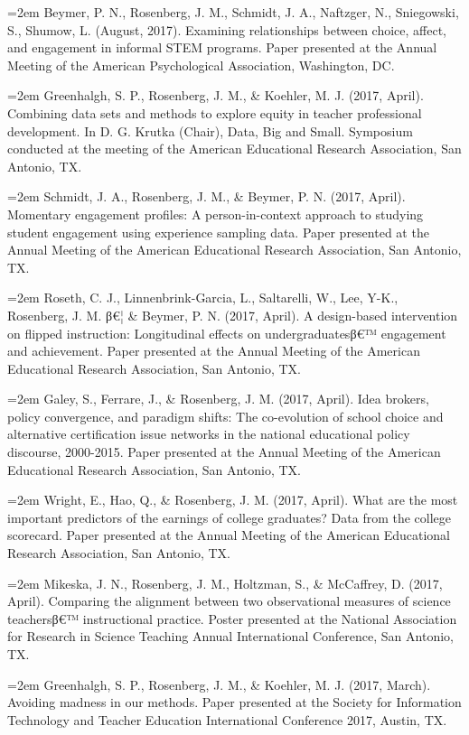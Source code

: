 \documentclass[]{article}
\newcommand{\euro}{€}
\begin{document}
\hangindent=2em Beymer, P. N., Rosenberg, J. M., Schmidt, J. A.,
Naftzger, N., Sniegowski, S., Shumow, L. (August, 2017). Examining
relationships between choice, affect, and engagement in informal STEM
programs. Paper presented at the Annual Meeting of the American
Psychological Association, Washington, DC.

\hangindent=2em Greenhalgh, S. P., Rosenberg, J. M., \& Koehler, M. J.
(2017, April). Combining data sets and methods to explore equity in
teacher professional development. In D. G. Krutka (Chair), Data, Big and
Small. Symposium conducted at the meeting of the American Educational
Research Association, San Antonio, TX.

\hangindent=2em Schmidt, J. A., Rosenberg, J. M., \& Beymer, P. N.
(2017, April). Momentary engagement profiles: A person-in-context
approach to studying student engagement using experience sampling data.
Paper presented at the Annual Meeting of the American Educational
Research Association, San Antonio, TX.

\hangindent=2em Roseth, C. J., Linnenbrink-Garcia, L., Saltarelli, W.,
Lee, Y-K., Rosenberg, J. M. β\euro{}¦ \& Beymer, P. N. (2017, April). A
design-based intervention on flipped instruction: Longitudinal effects
on undergraduatesβ\euro{}™ engagement and achievement. Paper presented
at the Annual Meeting of the American Educational Research Association,
San Antonio, TX.

\hangindent=2em Galey, S., Ferrare, J., \& Rosenberg, J. M. (2017,
April). Idea brokers, policy convergence, and paradigm shifts: The
co-evolution of school choice and alternative certification issue
networks in the national educational policy discourse, 2000-2015. Paper
presented at the Annual Meeting of the American Educational Research
Association, San Antonio, TX.

\hangindent=2em Wright, E., Hao, Q., \& Rosenberg, J. M. (2017, April).
What are the most important predictors of the earnings of college
graduates? Data from the college scorecard. Paper presented at the
Annual Meeting of the American Educational Research Association, San
Antonio, TX.

\hangindent=2em Mikeska, J. N., Rosenberg, J. M., Holtzman, S., \&
McCaffrey, D. (2017, April). Comparing the alignment between two
observational measures of science teachersβ\euro{}™ instructional
practice. Poster presented at the National Association for Research in
Science Teaching Annual International Conference, San Antonio, TX.

\hangindent=2em Greenhalgh, S. P., Rosenberg, J. M., \& Koehler, M. J.
(2017, March). Avoiding madness in our methods. Paper presented at the
Society for Information Technology and Teacher Education International
Conference 2017, Austin, TX.
\end{document}
